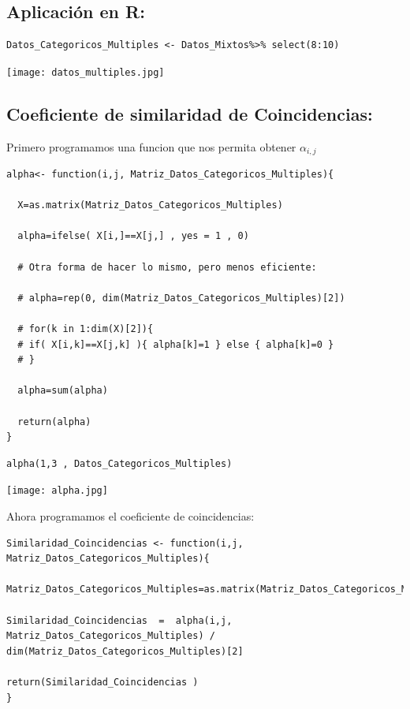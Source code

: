 \documentclass[12pt]{report} %
\begin{document}
\newpage

\subsection{Aplicación en R:}
\begin{lstlisting}
Datos_Categoricos_Multiples <- Datos_Mixtos%>% select(8:10)
\end{lstlisting}

\texttt{[image: datos\_multiples.jpg]}


\newpage

\subsection{Coeficiente de similaridad de Coincidencias:}

Primero programamos una funcion que nos permita obtener  $\alpha_{i,j}$

\begin{lstlisting}
alpha<- function(i,j, Matriz_Datos_Categoricos_Multiples){
  
  X=as.matrix(Matriz_Datos_Categoricos_Multiples)
  
  alpha=ifelse( X[i,]==X[j,] , yes = 1 , 0)
  
  # Otra forma de hacer lo mismo, pero menos eficiente:
    
  # alpha=rep(0, dim(Matriz_Datos_Categoricos_Multiples)[2])

  # for(k in 1:dim(X)[2]){
  # if( X[i,k]==X[j,k] ){ alpha[k]=1 } else { alpha[k]=0 }
  # }
  
  alpha=sum(alpha)
  
  return(alpha)
}
\end{lstlisting}


\begin{lstlisting}
alpha(1,3 , Datos_Categoricos_Multiples)
\end{lstlisting}

\texttt{[image: alpha.jpg]}


Ahora programamos el coeficiente de coincidencias:

\begin{lstlisting}
Similaridad_Coincidencias <- function(i,j,   Matriz_Datos_Categoricos_Multiples){

Matriz_Datos_Categoricos_Multiples=as.matrix(Matriz_Datos_Categoricos_Multiples)
  
Similaridad_Coincidencias  =  alpha(i,j, Matriz_Datos_Categoricos_Multiples) / dim(Matriz_Datos_Categoricos_Multiples)[2] 
  
return(Similaridad_Coincidencias )
}
\end{lstlisting}
\end{document}
